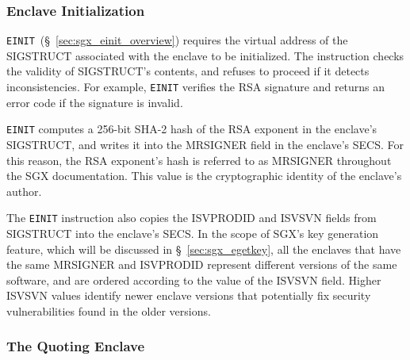 \subsubsection{Enclave Initialization}
\label{sec:sgx_einit}


\texttt{EINIT}~(\S~\ref{sec:sgx_einit_overview}) requires the virtual address
of the SIGSTRUCT associated with the enclave to be initialized. The instruction
checks the validity of SIGSTRUCT's contents, and refuses to proceed if it
detects inconsistencies. For example, \texttt{EINIT} verifies the RSA
signature and returns an error code if the signature is invalid.

\texttt{EINIT} computes a 256-bit SHA-2 hash of the RSA exponent in the
enclave's SIGSTRUCT, and writes it into the MRSIGNER field in the enclave's
SECS. For this reason, the RSA exponent's hash is referred to as MRSIGNER
throughout the SGX documentation. This value is the cryptographic identity of
the enclave's author.

The \texttt{EINIT} instruction also copies the ISVPRODID and ISVSVN fields from
SIGSTRUCT into the enclave's SECS. In the scope of SGX's key generation
feature, which will be discussed in \S~\ref{sec:sgx_egetkey}, all the enclaves
that have the same MRSIGNER and ISVPRODID represent different versions of the
same software, and are ordered according to the value of the ISVSVN field.
Higher ISVSVN values identify newer enclave versions that potentially fix
security vulnerabilities found in the older versions.


\subsubsection{The Quoting Enclave}
\label{sec:sgx_quoting_enclave}

